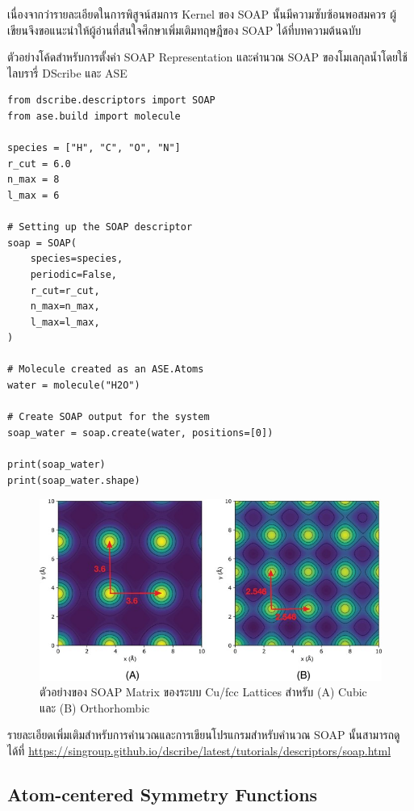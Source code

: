 เนื่องจากว่ารายละเอียดในการพิสูจน์สมการ Kernel ของ SOAP นั้นมีความซับซ้อนพอสมควร ผู้เขียนจึงขอแนะนำให้ผู้อ่านที่สนใจศึกษาเพิ่มเติมทฤษฎีของ 
SOAP ได้ที่บทความต้นฉบับ\autocite{bartok2013}

ตัวอย่างโค้ดสำหรับการตั้งค่า SOAP Representation และคำนวณ SOAP ของโมเลกุลน้ำโดยใช้ไลบรารี่ DScribe และ ASE

\begin{lstlisting}[style=MyPython]
from dscribe.descriptors import SOAP
from ase.build import molecule

species = ["H", "C", "O", "N"]
r_cut = 6.0
n_max = 8
l_max = 6

# Setting up the SOAP descriptor
soap = SOAP(
    species=species,
    periodic=False,
    r_cut=r_cut,
    n_max=n_max,
    l_max=l_max,
)

# Molecule created as an ASE.Atoms
water = molecule("H2O")

# Create SOAP output for the system
soap_water = soap.create(water, positions=[0])

print(soap_water)
print(soap_water.shape)
\end{lstlisting}

\begin{figure}[htbp]
    \centering
    \includegraphics[width=\linewidth]{fig/soap_matrix.jpg}
    \caption{ตัวอย่างของ SOAP Matrix ของระบบ Cu/fcc Lattices สำหรับ (A) Cubic และ (B) Orthorhombic}
    \label{fig:soap_matrix}
\end{figure}

\vspace{1em}

รายละเอียดเพิ่มเติมสำหรับการคำนวณและการเขียนโปรแกรมสำหรับคำนวณ SOAP นั้นสามารถดูได้ที่
\url{https://singroup.github.io/dscribe/latest/tutorials/descriptors/soap.html}

\subsection{Atom-centered Symmetry Functions}
\label{ssec:acsf}

